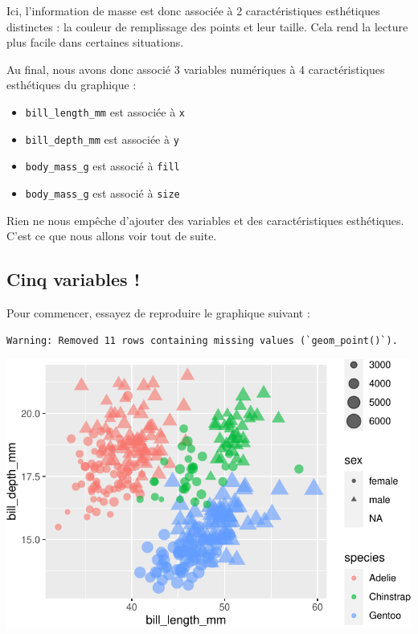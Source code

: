 \documentclass[
  a4paper,
  DIV=11,
  numbers=noendperiod,
  oneside]{scrreprt}
\providecommand{\tightlist}{%
  \setlength{\itemsep}{0pt}\setlength{\parskip}{0pt}}\usepackage{longtable,booktabs,array}
\begin{document}
Ici, l'information de masse est donc associée à 2 caractéristiques
esthétiques distinctes : la couleur de remplissage des points et leur
taille. Cela rend la lecture plus facile dans certaines situations.

Au final, nous avons donc associé 3 variables numériques à 4
caractéristiques esthétiques du graphique :

\begin{itemize}
\tightlist
\item
  \texttt{bill\_length\_mm} est associée à \texttt{x}
\item
  \texttt{bill\_depth\_mm} est associée à \texttt{y}
\item
  \texttt{body\_mass\_g} est associé à \texttt{fill}
\item
  \texttt{body\_mass\_g} est associé à \texttt{size}
\end{itemize}

Rien ne nous empêche d'ajouter des variables et des caractéristiques
esthétiques. C'est ce que nous allons voir tout de suite.

\subsection{Cinq variables !}\label{cinq-variables}

Pour commencer, essayez de reproduire le graphique suivant :

\begin{verbatim}
Warning: Removed 11 rows containing missing values (`geom_point()`).
\end{verbatim}

\includegraphics{03-visualization_files/figure-pdf/unnamed-chunk-78-1.pdf}
\end{document}
